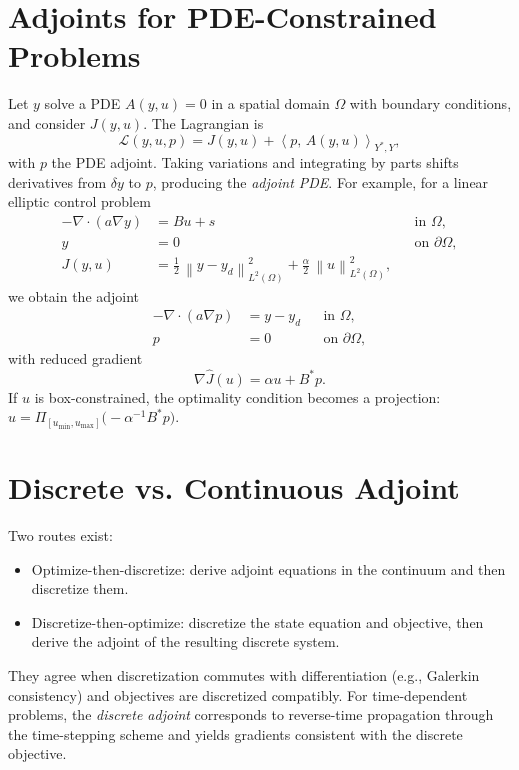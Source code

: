 \documentclass[11pt,a4paper]{article}
\numberwithin{equation}{section}
\theoremstyle{plain}
\theoremstyle{definition}
\newcommand{\ip}[2]{\left\langle #1,\,#2 \right\rangle}
\newcommand{\norm}[1]{\left\lVert #1 \right\rVert}
\begin{document}
\section{Adjoints for PDE-Constrained Problems}
\label{sec:PDE}
Let $y$ solve a PDE $A(y,u)=0$ in a spatial domain $\Omega$ with boundary conditions, and consider $J(y,u)$. The Lagrangian is
\begin{equation}
\mathcal{L}(y,u,p) = J(y,u) + \ip{p}{A(y,u)}_{Y^*,Y},
\end{equation}
with $p$ the PDE adjoint. Taking variations and integrating by parts shifts derivatives from $\delta y$ to $p$, producing the \emph{adjoint PDE}. For example, for a linear elliptic control problem
\begin{subequations}\label{eq:elliptic_example}
\begin{align}
-\nabla\cdot(a\nabla y) &= Bu + s && \text{in } \Omega, \\
 y &= 0 && \text{on } \partial\Omega, \\
J(y,u) &= \tfrac{1}{2}\,\norm{y-y_d}_{L^2(\Omega)}^2 + \tfrac{\alpha}{2}\,\norm{u}_{L^2(\Omega)}^2,
\end{align}
\end{subequations}
we obtain the adjoint
\begin{subequations}\label{eq:elliptic_adjoint}
\begin{align}
-\nabla\cdot(a\nabla p) &= y - y_d && \text{in } \Omega, \\
 p &= 0 && \text{on } \partial\Omega,
\end{align}
\end{subequations}
with reduced gradient
\begin{equation}
\nabla \hat J(u) = \alpha u + B^\ast p.
\end{equation}
If $u$ is box-constrained, the optimality condition becomes a projection: $u = \Pi_{[u_{\min},u_{\max}]}\big( -\alpha^{-1} B^\ast p \big)$.

\section{Discrete vs. Continuous Adjoint}
\label{sec:disc_vs_cont}
Two routes exist:
\begin{itemize}
  \item Optimize-then-discretize: derive adjoint equations in the continuum and then discretize them.
  \item Discretize-then-optimize: discretize the state equation and objective, then derive the adjoint of the resulting discrete system.
\end{itemize}
They agree when discretization commutes with differentiation (e.g., Galerkin consistency) and objectives are discretized compatibly. For time-dependent problems, the \emph{discrete adjoint} corresponds to reverse-time propagation through the time-stepping scheme and yields gradients consistent with the discrete objective.
\end{document}
